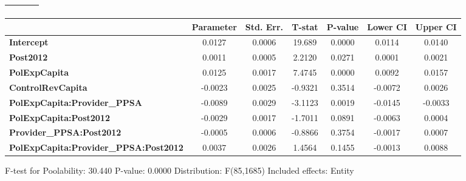 \begin{center}
\begin{tabular}{lclc}
\textbf{}                                     &                    & \textbf{                     }   &                  \\
\bottomrule
\end{tabular}
\begin{tabular}{lcccccc}
                                              & \textbf{Parameter} & \textbf{Std. Err.} & \textbf{T-stat} & \textbf{P-value} & \textbf{Lower CI} & \textbf{Upper CI}  \\
\midrule
\textbf{Intercept}                            &       0.0127       &       0.0006       &      19.689     &      0.0000      &       0.0114      &       0.0140       \\
\textbf{Post2012}                             &       0.0011       &       0.0005       &      2.2120     &      0.0271      &       0.0001      &       0.0021       \\
\textbf{PolExpCapita}                         &       0.0125       &       0.0017       &      7.4745     &      0.0000      &       0.0092      &       0.0157       \\
\textbf{ControlRevCapita}                     &      -0.0023       &       0.0025       &     -0.9321     &      0.3514      &      -0.0072      &       0.0026       \\
\textbf{PolExpCapita:Provider\_PPSA}          &      -0.0089       &       0.0029       &     -3.1123     &      0.0019      &      -0.0145      &      -0.0033       \\
\textbf{PolExpCapita:Post2012}                &      -0.0029       &       0.0017       &     -1.7011     &      0.0891      &      -0.0063      &       0.0004       \\
\textbf{Provider\_PPSA:Post2012}              &      -0.0005       &       0.0006       &     -0.8866     &      0.3754      &      -0.0017      &       0.0007       \\
\textbf{PolExpCapita:Provider\_PPSA:Post2012} &       0.0037       &       0.0026       &      1.4564     &      0.1455      &      -0.0013      &       0.0088       \\
\bottomrule
\end{tabular}
\end{center}

F-test for Poolability: 30.440 \newline
 P-value: 0.0000 \newline
 Distribution: F(85,1685) \newline
  \newline
 Included effects: Entity